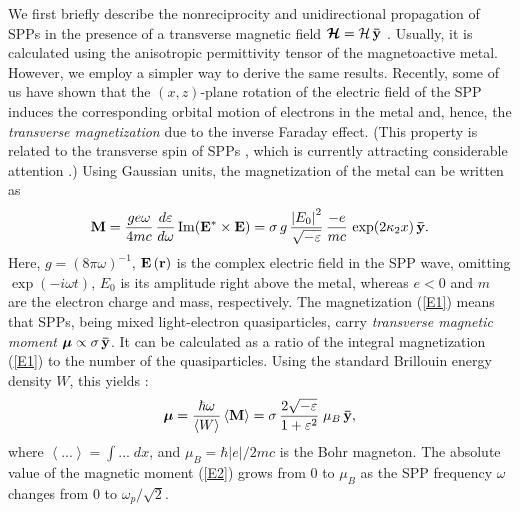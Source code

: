 \documentclass[9pt,twocolumn,twoside]{osajnl}
\begin{document}
We first briefly describe the nonreciprocity and unidirectional propagation of SPPs in the presence of a transverse magnetic field ${{\bm{\mathcal H}}} = {\mathcal H}\,{\bf{\bar y}}$ \cite{Yu2008,Hu,DE2013}. Usually, it is calculated using the anisotropic permittivity tensor of the magnetoactive metal. However, we employ a simpler way to derive the same results. Recently, some of us have shown \cite{Bliokh2017PRL,Bliokh2017NJP} that the $(x,z)$-plane rotation of the electric field of the SPP induces the corresponding orbital motion of electrons in the metal and, hence, the {\it transverse magnetization} due to the inverse Faraday effect. (This property is related to the transverse spin of SPPs \cite{Bliokh2012}, which is currently attracting considerable attention \cite{Bliokh2015PR,Aiello,Bliokh2015NP}.) Using Gaussian units, the magnetization of the metal can be written as \cite{Bliokh2017PRL,Bliokh2017NJP}
%
\begin{eqnarray}
{\bf{M}} = \frac{{ge \omega }}{{4mc}}\, \frac{{d\varepsilon }}{{d\omega }}\, {\rm Im}\! \left( {{{\bf{E}}^*} \times {\bf{E}}} \right) 
= \sigma \, g \, \frac{{\left| E_0 \right|^2}}{\sqrt{-\varepsilon}}\, \frac{{ - e}}{{mc}}\, \exp\!\left( {2{\kappa _2}x} \right){\bf{\bar y}}.
\label{E1}
\end{eqnarray}
%
Here, $g = {\left( {8\pi \omega } \right)^{ - 1}}$, ${\bf{E}}\left( {\bf{r}} \right)$ is the complex electric field in the SPP wave, omitting $\exp\! \left( { - i\omega t} \right)$, $E_0$ is its amplitude right above the metal, whereas $e<0$ and $m$ are the electron charge and mass, respectively. The magnetization (\ref{E1}) means that SPPs, being mixed light-electron quasiparticles, carry {\it transverse magnetic moment} $\bm{\mu}  \propto \sigma \, {\bf{\bar y}}$. It can be calculated as a ratio of the integral magnetization (\ref{E1}) to the number of the quasiparticles. Using the standard Brillouin energy density $W$, this yields \cite{Bliokh2017PRL,Bliokh2017NJP}:
%
\begin{equation}
\bm{\mu}  = \frac{{\hbar \omega }}{{\left\langle W \right\rangle }}\left\langle {\bf{M}} \right\rangle  = \sigma\, \frac{{2\sqrt { - \varepsilon } }}{{1 + {\varepsilon ^2}}}\,{\kern 1pt} {\mu _B}\,{\bf{\bar y}},
\label{E2}
\end{equation}
%
where $\left\langle {...} \right\rangle  = \int {...} \;dx$, and ${\mu _B} = \hbar \left| e \right|/2mc$ is the Bohr magneton. The absolute value of the magnetic moment (\ref{E2}) grows from 0 to $\mu_B$ as the SPP frequency $\omega$ changes from 0 to $\omega_p/\sqrt{2}$.
\end{document}
